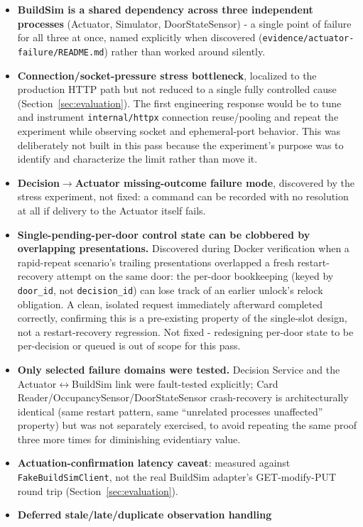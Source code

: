 \documentclass[11pt]{article}
\begin{document}
\begin{itemize}
regardless.
\item \textbf{BuildSim is a shared dependency across three independent
processes} (Actuator, Simulator, DoorStateSensor) - a single point of
failure for all three at once, named explicitly when discovered
(\texttt{evidence/actuator-failure/README.md}) rather than worked around
silently.
\item \textbf{Connection/socket-pressure stress bottleneck}, localized
to the production HTTP path but not reduced to a single fully controlled
cause (Section~\ref{sec:evaluation}). The first engineering response
would be to tune and instrument \texttt{internal/httpx} connection
reuse/pooling and repeat the experiment while observing socket and
ephemeral-port behavior. This was deliberately not built in this pass
because the experiment's purpose was to identify and characterize the
limit rather than move it.
\item \textbf{Decision\(\rightarrow\)Actuator missing-outcome failure
mode}, discovered by the stress experiment, not fixed: a command can be
recorded with no resolution at all if delivery to the Actuator itself
fails.
\item \textbf{Single-pending-per-door control state can be clobbered by
overlapping presentations.} Discovered during Docker verification when a
rapid-repeat scenario's trailing presentations overlapped a fresh
restart-recovery attempt on the same door: the per-door bookkeeping
(keyed by \texttt{door\_id}, not \texttt{decision\_id}) can lose track of
an earlier unlock's relock obligation. A clean, isolated request
immediately afterward completed correctly, confirming this is a
pre-existing property of the single-slot design, not a restart-recovery
regression. Not fixed - redesigning per-door state to be per-decision or
queued is out of scope for this pass.
\item \textbf{Only selected failure domains were tested.} Decision
Service and the Actuator\(\leftrightarrow\)BuildSim link were
fault-tested explicitly; Card Reader/OccupancySensor/DoorStateSensor
crash-recovery is architecturally identical (same restart pattern, same
``unrelated processes unaffected'' property) but was not separately
exercised, to avoid repeating the same proof three more times for
diminishing evidentiary value.
\item \textbf{Actuation-confirmation latency caveat}: measured against
\texttt{FakeBuildSimClient}, not the real BuildSim adapter's GET-modify-PUT
round trip (Section~\ref{sec:evaluation}).
\item \textbf{Deferred stale/late/duplicate observation handling}

\end{itemize}
\end{document}
